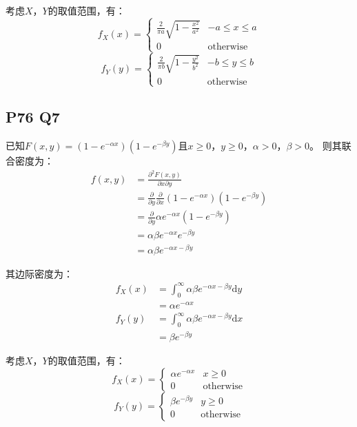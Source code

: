 \documentclass[a4paper,12pt]{ctexart}
\begin{document}
考虑$X$，$Y$的取值范围，有：
\begin{equation*}
	f_X(x) = 
	\begin{cases}
		\frac{2}{\pi a} \sqrt{1 - \frac{x^2}{a^2}} & -a \leq x \leq a \\
		0 & \text{otherwise}
	\end{cases}
\end{equation*}
\begin{equation*}
	f_Y(y) = 
	\begin{cases}
		\frac{2}{\pi b} \sqrt{1 - \frac{y^2}{b^2}} & -b \leq y \leq b \\
		0 & \text{otherwise}
	\end{cases}
\end{equation*}

\subsection*{P76 Q7}
已知$F(x,y) = (1-e^{-\alpha x})(1 - e^{-\beta y})$且$x \geq 0$，$y \geq 0$，$\alpha > 0$，$\beta > 0$。
则其联合密度为：
\begin{align*}
	f(x,y) &= \frac{\partial^2 F(x,y)}{\partial x \partial y} \\
	&= \frac{\partial}{\partial y} \frac{\partial}{\partial x} (1-e^{-\alpha x})(1 - e^{-\beta y}) \\
	&= \frac{\partial}{\partial y} \alpha e^{-\alpha x} (1 - e^{-\beta y}) \\
	&= \alpha \beta e^{-\alpha x} e^{-\beta y} \\
	&= \alpha \beta e^{-\alpha x - \beta y}
\end{align*}

其边际密度为：
\begin{align*}
	f_X(x) &= \int_0^{\infty} \alpha \beta e^{-\alpha x - \beta y} \mathrm{d}y \\
	&= \alpha e^{-\alpha x} \\
	f_Y(y) &= \int_0^{\infty} \alpha \beta e^{-\alpha x - \beta y} \mathrm{d}x \\
	&= \beta e^{-\beta y}
\end{align*}

考虑$X$，$Y$的取值范围，有：
\begin{equation*}
	f_X(x) = 
	\begin{cases}
		\alpha e^{-\alpha x} & x \geq 0 \\
		0 & \text{otherwise}
	\end{cases}
\end{equation*}
\begin{equation*}
	f_Y(y) = 
	\begin{cases}
		\beta e^{-\beta y} & y \geq 0 \\
		0 & \text{otherwise}
	\end{cases}
\end{equation*}
\end{document}
